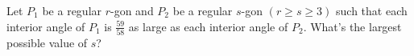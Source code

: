 Let $ P_1$ be a regular $ r$-gon and $ P_2$ be a regular $ s$-gon $ (r\geq s\geq 3)$ such that each interior angle of $ P_1$ is $ \frac {59}{58}$ as large as each interior angle of $ P_2$. What's the largest possible value of $ s$?
